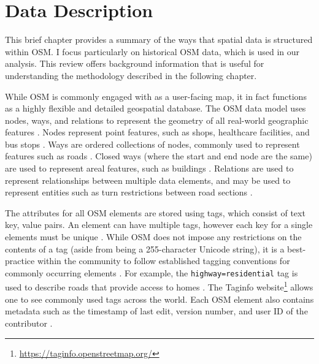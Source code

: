 \chapter{Data Description}
\label{chapterlabel3}
This brief chapter provides a summary of the ways that spatial data is structured within OSM. I focus particularly on historical OSM data, which is used in our analysis. This review offers background information that is useful for understanding the methodology described in the following chapter. 

While OSM is commonly engaged with as a user-facing map, it in fact functions as a highly flexible and detailed geospatial database. The OSM data model uses nodes, ways, and relations to represent the geometry of all real-world geographic features \parencite{openstreetmap_wiki_elements_2020}. Nodes represent point features, such as shops, healthcare facilities, and bus stops \parencite{openstreetmap_wiki_node_2019}. Ways are ordered collections of nodes, commonly used to represent features such as roads \parencite{openstreetmap_wiki_way_2020}. Closed ways (where the start and end node are the same) are used to represent areal features, such as buildings \parencite{openstreetmap_wiki_way_2020}. Relations are used to represent relationships between multiple data elements, and may be used to represent entities such as turn restrictions between road sections \parencite{openstreetmap_wiki_relation_2019}. 


The attributes for all OSM elements are stored using tags, which consist of text key, value pairs. An element can have multiple tags, however each key for a single elements must be unique \parencite{openstreetmap_wiki_tags_2020}. While OSM does not impose any restrictions on the contents of a tag (aside from being a 255-character Unicode string), it is a best-practice within the community to follow established tagging conventions for commonly occurring elements \parencite{openstreetmap_wiki_tags_2020}. For example, the \texttt{highway=residential} tag is used to describe roads that provide access to homes \parencite{openstreetmap_wiki_elements_2020}. The Taginfo website\footnote{\url{https://taginfo.openstreetmap.org/}} allows one to see commonly used tags across the world. Each OSM element also contains metadata such as the timestamp of last edit, version number, and user ID of the contributor \parencite{openstreetmap_wiki_elements_2020}. 



